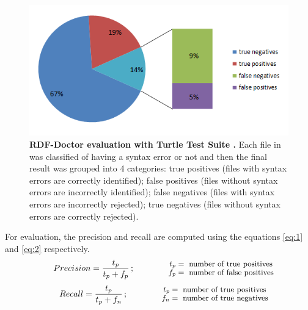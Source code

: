 \begin{figure}[ht]
\begin{center}
		\includegraphics[scale=0.8,angle=0]{images/Experiment01.png}
		\caption{\textbf{RDF-Doctor evaluation with Turtle Test Suite \cite{TurtleTests:Online}.} Each file in \cite{TurtleTests:Online} was classified of having a syntax error or not and then the final result was grouped into 4 categories: true positives (files with syntax errors are correctly identified); false positives (files without syntax errors are incorrectly identified); false negatives (files with syntax errors are incorrectly rejected); true negatives (files without syntax errors are correctly rejected).}
		\label{Fig:Experiment01}
\end{center}
\end{figure}

For evaluation, the precision and recall are computed using the equations \ref{eq:1} and \ref{eq:2} respectively.  
\begin{align} 
   Precision=  \frac{t_p}{t_p+f_p}\,;\qquad
\qquad\parbox{4.0cm}{\footnotesize$\begin{aligned} t_p &= \text{ number of true positives}\\[-1.0ex] f_p &= \text{ number of false positives}\end{aligned}$}
   \label{eq:1}
\end{align}
\begin{align}
   Recall =  \frac{t_p}{t_p+f_n} \,;\qquad
\qquad\parbox{4.0cm}{\footnotesize$\begin{aligned} t_p &= \text{ number of true positives}\\[-1.0ex] f_n &= \text{ number of true negatives}\end{aligned}$}
   \label{eq:2}
\end{align}



